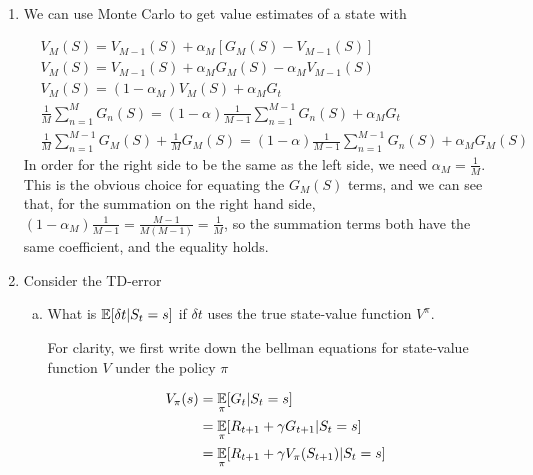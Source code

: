 \documentclass{exam}
\newcommand{\vm}{V_M(S)}
\newcommand{\gm}{G_M(S)}
\newcommand{\vmo}{V_{M-1}(S)}
\begin{document}
\begin{problem}
\ \newline

\begin{enumerate}
    \item We can use Monte Carlo to get value estimates of a state with
    \begin{solutionorlines}[2in]
    \begin{align*}
        & \vm = \vmo + \alpha_M [\gm - \vmo]  \\
        & \vm = \vmo + \alpha_M \gm - \alpha_M \vmo  \\
        & \vm = ( 1 - \alpha_M ) \vm + \alpha_M G_{t} \\
        & \frac{1}{M} \sum_{n=1}^{M} G_n(S) = ( 1 - \alpha ) \frac{1}{M-1} \sum_{n=1}^{M-1} G_n(S) + \alpha_M G_{t} \\
        &\frac{1}{M} \sum_{n=1}^{M-1} G_M(S) + \frac{1}{M} \gm = ( 1 - \alpha ) \frac{1}{M-1} \sum_{n=1}^{M-1} G_n(S) +  \alpha_M G_M(S)
    \end{align*}
    In order for the right side to be the same as the left side, we need $\alpha_M = \frac{1}{M}$. This is the obvious choice for equating the $\gm$ terms, and we can see that, for the summation on the right hand side, $(1 - \alpha_M) \frac{1}{M-1} =  \frac{M-1}{M(M-1)} = \frac{1}{M}$, so the summation terms both have the same coefficient, and the equality holds.
    \end{solutionorlines}
    
\item Consider the TD-error

    \begin{enumerate}[(a)]
    
    \item What is $\operatorname*{\mathbb{E}}[\delta t |S_t = s]$ if $\delta t$ uses the true state-value function $V^\pi$.
    \begin{solutionorlines}[2in]
    
    For clarity, we first write down the bellman equations for state-value function $V$ under the policy $\pi$
    
    \begin{align*}
        V_{\pi}(s) &= \operatorname*{\mathbb{E}}_{\pi}[G_t | S_t = s] \\
        &= \operatorname*{\mathbb{E}}_{\pi}[R_{t+1} + \gamma G_{t+1} | S_t = s] \\
        &= \operatorname*{\mathbb{E}}_{\pi}[R_{t+1} + \gamma V_{\pi}(S_{t+1}) | S_t = s] 
    \end{align*}
    

\end{solutionorlines}
\end{enumerate}
\end{enumerate}
\end{problem}
\end{document}
